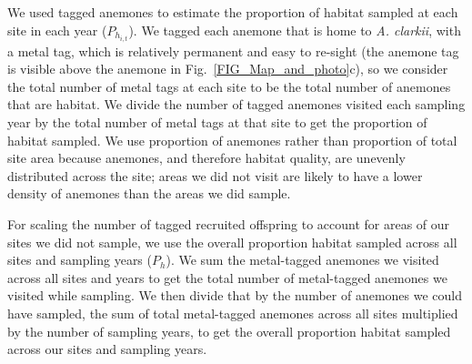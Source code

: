 \documentclass[12pt, oneside]{article}   	%
\begin{document}
We used tagged anemones to estimate the proportion of habitat sampled at each site in each year ($P_{h_{i,t}}$). We tagged each anemone that is home to \textit{A. clarkii}, with a metal tag, which is relatively permanent and easy to re-sight (the anemone tag is visible above the anemone in Fig.\ \ref{FIG_Map_and_photo}c), so we consider the total number of metal tags at each site to be the total number of anemones that are habitat. We divide the number of tagged anemones visited each sampling year by the total number of metal tags at that site to get the proportion of habitat sampled. We use proportion of anemones rather than proportion of total site area because anemones, and therefore habitat quality, are unevenly distributed across the site; areas we did not visit are likely to have a lower density of anemones than the areas we did sample.

For scaling the number of tagged recruited offspring to account for areas of our sites we did not sample, we use the overall proportion habitat sampled across all sites and sampling years ($P_h$). We sum the metal-tagged anemones we visited across all sites and years to get the total number of metal-tagged anemones we visited while sampling. We then divide that by the number of anemones we could have sampled, the sum of total metal-tagged anemones across all sites multiplied by the number of sampling years, to get the overall proportion habitat sampled across our sites and sampling years.

\end{document}
